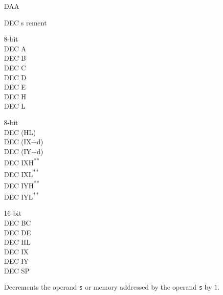 \documentclass[12pt,twoside,openright,a4paper]{book}
\newcommand{\UNDOC}{\textnormal{\textsuperscript{**}}}
\begin{document}
\begin{basedescript}{
	\desclabelstyle{\multilinelabel}
	\desclabelwidth{3cm}}
\begin{DetailItem}{DAA}
		\begin{DetailEffects}[p]
			\FlagsDAA
		\end{DetailEffects}
		
		\begin{DetailTiming}
		\end{DetailTiming}

	\end{DetailItem}

	\begin{DetailItem}{DEC s}
		{rement}
		{}

		\begin{DetailVariants}
			\textnormal{8-bit}\\
			DEC A\\
			DEC B\\
			DEC C\\
			DEC D\\
			DEC E\\
			DEC H\\
			DEC L

			\columnbreak
			\textnormal{8-bit}\\
			DEC (HL)\\
			DEC (IX+d)\\
			DEC (IY+d)\\
			DEC IXH\UNDOC\\
			DEC IXL\UNDOC\\
			DEC IYH\UNDOC\\
			DEC IYL\UNDOC

			\columnbreak
			\textnormal{16-bit}\\
			DEC BC\\
			DEC DE\\
			DEC HL\\
			DEC IX\\
			DEC IY\\
			DEC SP
		\end{DetailVariants}

		Decrements the operand {\tt s} or memory addressed by the operand {\tt s} by 1.

		\begin{DetailEffects}[v]
			\FlagsDECr[8-bit]
		\end{DetailEffects}
		

\end{DetailItem}
\end{basedescript}
\end{document}
